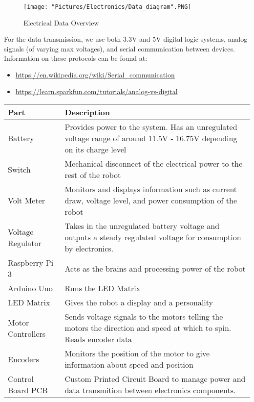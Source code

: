 \documentclass[12pt]{article}
\begin{document}
\begin{figure}[H]
  	\centering
   	\texttt{[image: "Pictures/Electronics/Data\_diagram".PNG]}
  	\caption{Electrical Data Overview}
	\label{data}
\end{figure}

\noindent For the data transmission, we use both 3.3V and 5V digital logic systems, analog signals (of varying max voltages), and serial communication between devices. Information on these protocols can be found at:

\begin{itemize}
	\item \href{https://en.wikipedia.org/wiki/Serial_communication}{https://en.wikipedia.org/wiki/Serial\_communication}
	\item \href{https://learn.sparkfun.com/tutorials/analog-vs-digital}{https://learn.sparkfun.com/tutorials/analog-vs-digital}
\end{itemize}


\begin{tabular}[2]{|p{4cm}|p{11cm}|}
	\hline
	\textbf{Part} & \textbf{Description} \\ \hline
	Battery & Provides power to the system. Has an unregulated voltage range of around 11.5V - 16.75V depending on its charge level \\ \hline
	Switch & Mechanical disconnect of the electrical power to the rest of the robot \\ \hline
	Volt Meter & Monitors and displays information such as current draw, voltage level, and power consumption of the robot \\ \hline
	Voltage Regulator & Takes in the unregulated battery voltage and outputs a steady regulated voltage for consumption by electronics. \\ \hline
	Raspberry Pi 3 & Acts as the brains and processing power of the robot \\ \hline
	Arduino Uno & Runs the LED Matrix \\ \hline
	LED Matrix & Gives the robot a display and a personality\\ \hline
	Motor Controllers & Sends voltage signals to the motors telling the motors the direction and speed at which to spin. Reads encoder data \\ \hline
	Encoders & Monitors the position of the motor to give information about speed and position \\ \hline
	Control Board PCB & Custom Printed Circuit Board to manage power and data transmition between electronics components. \\ \hline
\end{tabular}
\end{document}
